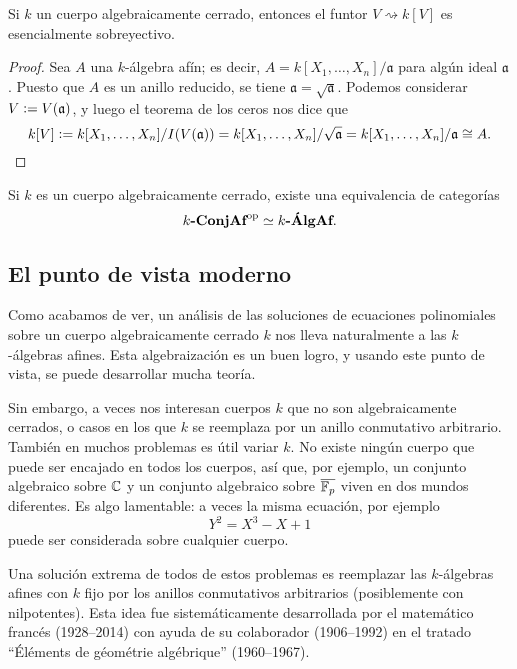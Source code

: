 \documentclass{article}
\numberwithin{equation}{section}
\theoremstyle{definition}
\begin{document}
\begin{proposicion}
  Si $k$ un cuerpo algebraicamente cerrado, entonces el funtor
  $V \rightsquigarrow k[V]$ es esencialmente sobreyectivo.

\begin{proof}
  Sea $A$ una $k$-álgebra afín; es decir, $A = k [X_1,\ldots,X_n]/\mathfrak{a}$
  para algún ideal $\mathfrak{a}$. Puesto que $A$ es un anillo reducido,
  se tiene $\mathfrak{a} = \sqrt{\mathfrak{a}}$. Podemos considerar
  $V \mathrel{\mathop:}= V (\mathfrak{a})$, y luego el teorema de los ceros nos dice que
  \[ k [V] \mathrel{\mathop:}= k[X_1,\ldots,X_n]/I (V (\mathfrak{a})) =
     k[X_1,\ldots,X_n]/\sqrt{\mathfrak{a}} =
     k[X_1,\ldots,X_n]/\mathfrak{a} \cong A. \qedhere \]
 \end{proof}
\end{proposicion}

\begin{corolario}
  Si $k$ es un cuerpo algebraicamente cerrado, existe una equivalencia de
  categorías
  $$k\text{\bf -ConjAf}^\mathrm{op} \simeq k\text{\bf -ÁlgAf}.$$
\end{corolario}

\subsection*{El punto de vista moderno}

Como acabamos de ver, un análisis de las soluciones de ecuaciones polinomiales
sobre un cuerpo algebraicamente cerrado $k$ nos lleva naturalmente a las
$k$-álgebras afines. Esta algebraización es un buen logro, y usando este punto
de vista, se puede desarrollar mucha teoría.

Sin embargo, a veces nos interesan cuerpos $k$ que no son algebraicamente
cerrados, o casos en los que $k$ se reemplaza por un anillo conmutativo
arbitrario. También en muchos problemas es útil variar $k$. No existe ningún
cuerpo que puede ser encajado en todos los cuerpos, así que, por ejemplo, un
conjunto algebraico sobre $\mathbb{C}$ y un conjunto algebraico sobre
$\overline{\mathbb{F}_p}$ viven en dos mundos diferentes. Es algo lamentable: a veces
la misma ecuación, por ejemplo
$$Y^2 = X^3 - X + 1$$
puede ser considerada sobre cualquier cuerpo.

Una solución extrema de todos de estos problemas es reemplazar las $k$-álgebras
afines con $k$ fijo por los anillos conmutativos arbitrarios (posiblemente con
nilpotentes). Esta idea fue sistemáticamente desarrollada por el matemático
francés  (1928--2014) con ayuda de su
colaborador  (1906--1992) en el tratado
``Éléments de géométrie algébrique'' (1960--1967).
\end{document}
